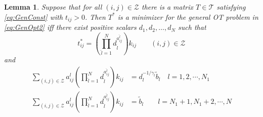 \documentclass[twocolumn]{article}
\newtheorem{lemma}{Lemma}
\begin{document}
\begin{lemma}
\label{lem:lem2bGen}
Suppose that for all $(i,j) \in {\mathcal Z}$ there is a matrix $T\in {\mathcal T}$ satisfying \eqref{eq:GenConst} with $t_{ij} >0$.
Then $T^*$ is a minimizer for the general OT problem in  \eqref{eq:GenOpt2} iff
there exist positive scalars $d_1,d_2, \dots, d_N$ 
 such that
\begin{equation}
\label{eq:tijstar}
t^*_{ij} = \left(\prod_{\hat{l}=1}^Nd_{\hat l }^{a^{\hat l}_{ij}} \right)
k_{ij}\qquad 
(i, j)\in \mathcal{Z}
\end{equation}
and
\begin{align}
\label{eq:dconst3}
\sum_{(i,j) \in \mathcal{Z}} a^l_{ij}
\left(\prod_{{\hat l }=1}^Nd_{\hat l }^{a^{\hat l}_{ij}} \right) k_{ij} 
&=d_{l}^{-1/\gamma_{l}} \tilde{b}_l
\quad l= 1,2, \cdots, N_1
\\
\sum_{(i,j) \in \mathcal{Z}} a^l_{ij}\left(\prod_{{\hat l}=1}^Nd_{\hat l}^{a^{\hat l}_{ij}} \right)
 k_{ij} 
&=  \tilde{b}_l
\qquad l=N_1+1, N_1+2, \cdots, N
\label{eq:dconst4}
\end{align}

\end{lemma}
\end{document}
